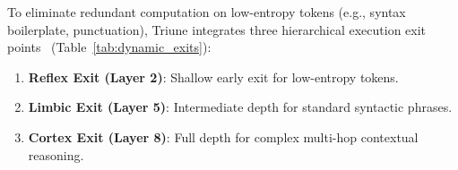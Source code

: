 \documentclass[10pt,twocolumn,letterpaper]{article}
\begin{document}
\begin{table}[t]
\centering
\small
\caption{\textbf{Hierarchical Dynamic Exits Quality-vs-Compute Pareto Frontier} ($B=4, T=512, V=4096$, \texttt{dynamic\_exits\_results.json}); on the rescued $90.79\text{M}$ \texttt{step\_40555} checkpoint ($B=4, T=512, V=32000$), Reflex/Limbic/Cortex reach $2.764 / 8.247 / 11.90\text{ ms}$ ($4.31\times$ Reflex speedup).}
\label{tab:dynamic_exits}
\end{table}

To eliminate redundant computation on low-entropy tokens (e.g., syntax boilerplate, punctuation), Triune integrates three hierarchical execution exit points~\cite{xin2020deebert,liu2020fastbert,schuster2022confident} (Table~\ref{tab:dynamic_exits}):
\begin{enumerate}
    \item \textbf{Reflex Exit (Layer 2)}: Shallow early exit for low-entropy tokens.
    \item \textbf{Limbic Exit (Layer 5)}: Intermediate depth for standard syntactic phrases.
    \item \textbf{Cortex Exit (Layer 8)}: Full depth for complex multi-hop contextual reasoning.
\end{enumerate}
\end{document}
